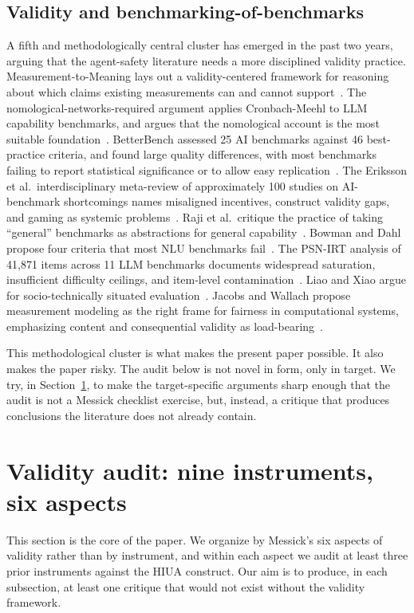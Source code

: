 \documentclass{article}
\begin{document}
\subsection{Validity and benchmarking-of-benchmarks}
A fifth and methodologically central cluster has emerged in the past two years, arguing that the agent-safety literature needs a more disciplined validity practice. Measurement-to-Meaning lays out a validity-centered framework for reasoning about which claims existing measurements can and cannot support~\cite{m2m2025}. The nomological-networks-required argument applies Cronbach-Meehl to LLM capability benchmarks, and argues that the nomological account is the most suitable foundation~\cite{nomologicalnetworks2026}. BetterBench assessed 25 AI benchmarks against 46 best-practice criteria, and found large quality differences, with most benchmarks failing to report statistical significance or to allow easy replication~\cite{betterbench2024}. The Eriksson et al.\ interdisciplinary meta-review of approximately 100 studies on AI-benchmark shortcomings names misaligned incentives, construct validity gaps, and gaming as systemic problems~\cite{canwetrust2025}. Raji et al.\ critique the practice of taking ``general'' benchmarks as abstractions for general capability~\cite{raji2021}. Bowman and Dahl propose four criteria that most NLU benchmarks fail~\cite{bowmandahl2021}. The PSN-IRT analysis of 41{,}871 items across 11 LLM benchmarks documents widespread saturation, insufficient difficulty ceilings, and item-level contamination~\cite{lostinbench2025}. Liao and Xiao argue for socio-technically situated evaluation~\cite{liaoxiao2023}. Jacobs and Wallach propose measurement modeling as the right frame for fairness in computational systems, emphasizing content and consequential validity as load-bearing~\cite{jacobswallach2021}.

This methodological cluster is what makes the present paper possible. It also makes the paper risky. The audit below is not novel in form, only in target. We try, in Section~\ref{sec:audit}, to make the target-specific arguments sharp enough that the audit is not a Messick checklist exercise, but, instead, a critique that produces conclusions the literature does not already contain.

\section{Validity audit: nine instruments, six aspects}
\label{sec:audit}
This section is the core of the paper. We organize by Messick's six aspects of validity rather than by instrument, and within each aspect we audit at least three prior instruments against the HIUA construct. Our aim is to produce, in each subsection, at least one critique that would not exist without the validity framework.
\end{document}
